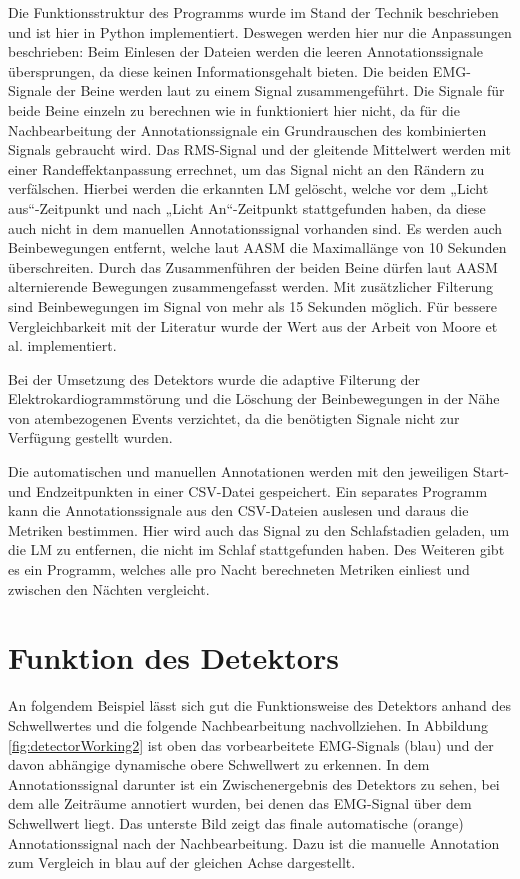 Die Funktionsstruktur des Programms wurde im Stand der Technik beschrieben und ist hier in Python implementiert. Deswegen werden hier nur die Anpassungen beschrieben:
Beim Einlesen der Dateien werden die leeren Annotationssignale übersprungen, da diese keinen Informationsgehalt bieten. Die beiden EMG-Signale der Beine werden laut \cite{Moore} zu einem Signal zusammengeführt. Die Signale für beide Beine einzeln zu berechnen wie in \cite{alvarez} funktioniert hier nicht, da für die Nachbearbeitung der Annotationssignale ein Grundrauschen des kombinierten Signals gebraucht wird.
Das RMS-Signal und der gleitende Mittelwert werden mit einer Randeffektanpassung errechnet, um das Signal nicht an den Rändern zu verfälschen. 
Hierbei werden die erkannten LM gelöscht, welche vor dem „Licht aus“-Zeitpunkt und nach „Licht An“-Zeitpunkt stattgefunden haben, da diese auch nicht in dem manuellen Annotationssignal vorhanden sind. 
Es werden auch Beinbewegungen entfernt, welche laut AASM die Maximallänge von 10 Sekunden überschreiten. Durch das Zusammenführen der beiden Beine dürfen laut AASM alternierende Bewegungen zusammengefasst werden. Mit zusätzlicher Filterung sind Beinbewegungen im Signal von mehr als 15 Sekunden möglich. Für bessere Vergleichbarkeit mit der Literatur wurde der Wert aus der Arbeit von Moore et al. implementiert. 

Bei der Umsetzung des Detektors wurde die adaptive Filterung der Elektrokardiogrammstörung und die Löschung der Beinbewegungen in der Nähe von atembezogenen Events verzichtet, da die benötigten Signale nicht zur Verfügung gestellt wurden. 

Die automatischen und manuellen Annotationen werden mit den jeweiligen Start- und Endzeitpunkten in einer CSV-Datei gespeichert.
Ein separates Programm kann die Annotationssignale aus den CSV-Dateien auslesen und daraus die Metriken bestimmen. Hier wird auch das Signal zu den Schlafstadien geladen, um die LM zu entfernen, die nicht im Schlaf stattgefunden haben. 
Des Weiteren gibt es ein Programm, welches alle pro Nacht berechneten Metriken einliest und zwischen den Nächten vergleicht.

\section{Funktion des Detektors}
An folgendem Beispiel lässt sich gut die Funktionsweise des Detektors anhand des Schwellwertes und die folgende Nachbearbeitung nachvollziehen. In Abbildung \ref{fig:detectorWorking2} ist oben das vorbearbeitete EMG-Signals (blau) und der davon abhängige dynamische obere Schwellwert zu erkennen. In dem Annotationssignal darunter ist ein Zwischenergebnis des Detektors zu sehen, bei dem alle Zeiträume annotiert wurden, bei denen das EMG-Signal über dem Schwellwert liegt. 
Das unterste Bild zeigt das finale automatische (orange) Annotationssignal nach der Nachbearbeitung. Dazu ist die manuelle Annotation zum Vergleich in blau auf der gleichen Achse dargestellt. 



